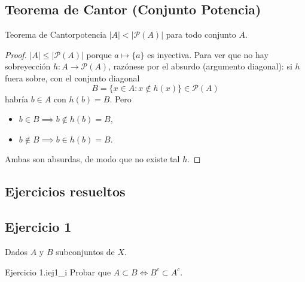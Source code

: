 \documentclass[11pt, a4paper]{article}
\begin{document}
\subsection{Teorema de Cantor (Conjunto Potencia)}

\begin{teorema}{Teorema de Cantor}{potencia}
$|A| < |\mathcal{P}(A)|$ para todo conjunto $A$.
\end{teorema}

\begin{proof}
$|A| \le |\mathcal{P}(A)|$ porque $a \mapsto \{a\}$ es inyectiva. Para ver que no hay sobreyección
$h: A \to \mathcal{P}(A)$, razónese por el absurdo (argumento diagonal): si $h$ fuera sobre, con el
conjunto diagonal
$$ B = \{ x \in A : x \notin h(x) \} \in \mathcal{P}(A) $$
habría $b \in A$ con $h(b) = B$. Pero
\begin{itemize}
    \item $b \in B \implies b \notin h(b) = B$,
    \item $b \notin B \implies b \in h(b) = B$.
\end{itemize}
Ambas son absurdas, de modo que no existe tal $h$.
\end{proof}

\newpage

\subsection{Ejercicios resueltos}

\subsection*{Ejercicio 1}

Dados $A$ y $B$ subconjuntos de $X$.

\begin{proposicion}{Ejercicio 1.i}{ej1_i}
Probar que $A \subset B \iff B^c \subset A^c$.
\end{proposicion}
\end{document}
